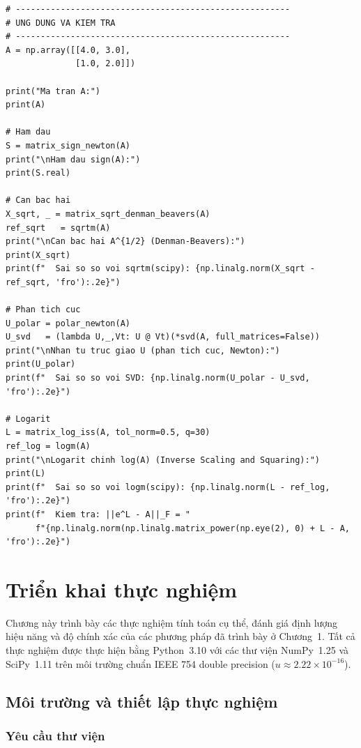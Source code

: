 \documentclass[12pt,a4paper]{report}
\begin{document}
\begin{lstlisting}[style=python, caption={Hàm dấu, căn bậc hai, phân tích cực và logarit ma trận -- lặp Newton và Denman-Beavers}]
# -------------------------------------------------------
# UNG DUNG VA KIEM TRA
# -------------------------------------------------------
A = np.array([[4.0, 3.0],
              [1.0, 2.0]])

print("Ma tran A:")
print(A)

# Ham dau
S = matrix_sign_newton(A)
print("\nHam dau sign(A):")
print(S.real)

# Can bac hai
X_sqrt, _ = matrix_sqrt_denman_beavers(A)
ref_sqrt   = sqrtm(A)
print("\nCan bac hai A^{1/2} (Denman-Beavers):")
print(X_sqrt)
print(f"  Sai so so voi sqrtm(scipy): {np.linalg.norm(X_sqrt - ref_sqrt, 'fro'):.2e}")

# Phan tich cuc
U_polar = polar_newton(A)
U_svd   = (lambda U,_,Vt: U @ Vt)(*svd(A, full_matrices=False))
print("\nNhan tu truc giao U (phan tich cuc, Newton):")
print(U_polar)
print(f"  Sai so so voi SVD: {np.linalg.norm(U_polar - U_svd, 'fro'):.2e}")

# Logarit
L = matrix_log_iss(A, tol_norm=0.5, q=30)
ref_log = logm(A)
print("\nLogarit chinh log(A) (Inverse Scaling and Squaring):")
print(L)
print(f"  Sai so so voi logm(scipy): {np.linalg.norm(L - ref_log, 'fro'):.2e}")
print(f"  Kiem tra: ||e^L - A||_F = "
      f"{np.linalg.norm(np.linalg.matrix_power(np.eye(2), 0) + L - A, 'fro'):.2e}")
\end{lstlisting}

\chapter{Triển khai thực nghiệm}

Chương này trình bày các thực nghiệm tính toán cụ thể, đánh giá định lượng hiệu năng
và độ chính xác của các phương pháp đã trình bày ở Chương~1. Tất cả thực nghiệm được
thực hiện bằng Python~3.10 với các thư viện NumPy~1.25 và SciPy~1.11 trên môi trường
chuẩn IEEE 754 double precision ($u \approx 2.22 \times 10^{-16}$).

\section{Môi trường và thiết lập thực nghiệm}

\subsection{Yêu cầu thư viện}
\end{document}
